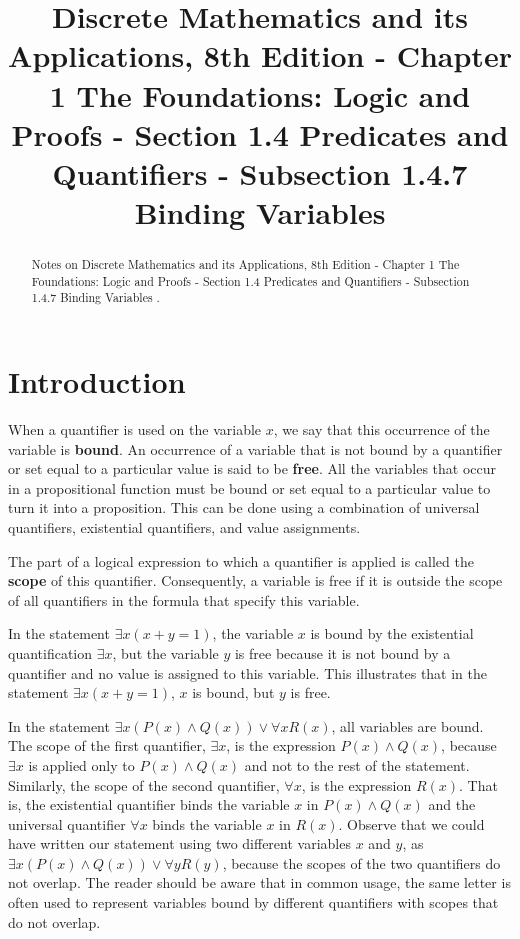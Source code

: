 \documentclass{Axon}
\title{Discrete Mathematics and its Applications, 8th Edition - Chapter 1 The Foundations: Logic and Proofs - Section 1.4 Predicates and Quantifiers - Subsection 1.4.7 Binding Variables}
\begin{document}
\maketitle
\makeauthor
\begin{abstract}
Notes on Discrete Mathematics and its Applications, 8th Edition - Chapter 1 The Foundations: Logic and Proofs - Section 1.4 Predicates and Quantifiers - Subsection 1.4.7 Binding Variables \cite{Rosen}.
\end{abstract}
\section{Introduction}
When a quantifier is used on the variable \(x\), we say that this occurrence of the variable is \textbf{bound}. An occurrence of a variable that is not bound by a quantifier or set equal to a particular value is said to be \textbf{free}. All the variables that occur in a propositional function must be bound or set equal to a particular value to turn it into a proposition. This can be done using a combination of universal quantifiers, existential quantifiers, and value assignments.

The part of a logical expression to which a quantifier is applied is called the \textbf{scope} of this quantifier. Consequently, a variable is free if it is outside the scope of all quantifiers in the formula that specify this variable.

\begin{example}
    In the statement \(\exists x (x + y = 1)\), the variable \(x\) is bound by the existential quantification \(\exists x\), but the variable \(y\) is free because it is not bound by a quantifier and no value is assigned to this variable. This illustrates that in the statement \(\exists x (x + y = 1)\), \(x\) is bound, but \(y\) is free.

    In the statement \(\exists x (P(x) \land Q(x)) \lor \forall x R(x)\), all variables are bound. The scope of the first quantifier, \(\exists x\), is the expression \(P(x) \land Q(x)\), because \(\exists x\) is applied only to \(P(x) \land Q(x)\) and not to the rest of the statement. Similarly, the scope of the second quantifier, \(\forall x\), is the expression \(R(x)\). That is, the existential quantifier binds the variable \(x\) in \(P(x) \land Q(x)\) and the universal quantifier \(\forall x\) binds the variable \(x\) in \(R(x)\). Observe that we could have written our statement using two different variables \(x\) and \(y\), as \(\exists x(P(x) \land Q(x)) \lor \forall y R(y)\), because the scopes of the two quantifiers do not overlap. The reader should be aware that in common usage, the same letter is often used to represent variables bound by different quantifiers with scopes that do not overlap.
\end{example}

\printbibliography
\end{document}
